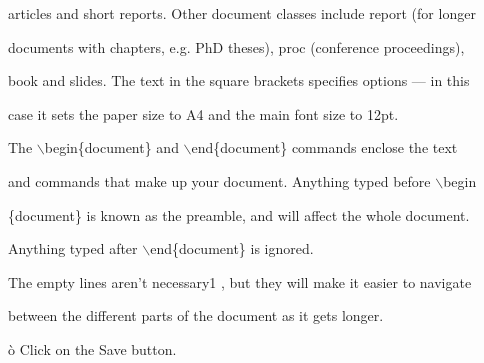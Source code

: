 \documentclass[a4paper,portrait,12pt]{article}
\begin{document}
\begin{flushleft}
articles and short reports. Other document classes include report (for longer
\end{flushleft}


\begin{flushleft}
documents with chapters, e.g. PhD theses), proc (conference proceedings),
\end{flushleft}


\begin{flushleft}
book and slides. The text in the square brackets specifies options --- in this
\end{flushleft}


\begin{flushleft}
case it sets the paper size to A4 and the main font size to 12pt.
\end{flushleft}


\begin{flushleft}
The \ensuremath{\backslash}begin\{document\} and \ensuremath{\backslash}end\{document\} commands enclose the text
\end{flushleft}


\begin{flushleft}
and commands that make up your document. Anything typed before \ensuremath{\backslash}begin
\end{flushleft}


\begin{flushleft}
\{document\} is known as the preamble, and will affect the whole document.
\end{flushleft}


\begin{flushleft}
Anything typed after \ensuremath{\backslash}end\{document\} is ignored.
\end{flushleft}


\begin{flushleft}
The empty lines aren't necessary1 , but they will make it easier to navigate
\end{flushleft}


\begin{flushleft}
between the different parts of the document as it gets longer.
\end{flushleft}





\begin{flushleft}
\`{o} Click on the Save button.
\end{flushleft}
\end{document}
